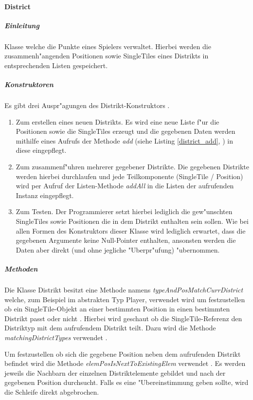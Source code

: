 \paragraph{District}
\label{par:district}
\subparagraph{Einleitung}
Klasse welche die Punkte eines Spielers verwaltet. Hierbei werden die zusammenh"angenden Positionen sowie SingleTiles eines Distrikts in entsprechenden Listen gespeichert. 

\subparagraph{Konstruktoren} 
\label{spar:districtKonstruktoren}
Es gibt drei Auspr"agungen des Distrikt-Konstruktors . 
\begin{enumerate}
	\item Zum erstellen eines neuen Distrikts. Es wird eine neue Liste f"ur die Positionen sowie die SingleTiles erzeugt und die gegebenen Daten werden mithilfe eines Aufrufs der Methode \emph{add} (siehe Listing \ref{district_add}, ) in diese eingepflegt. 
	\item Zum zusammenf"uhren mehrerer gegebener Distrikte. Die gegebenen Distrikte werden hierbei durchlaufen und jede Teilkomponente (SingleTile / Position) wird per Aufruf der Listen-Methode \emph{addAll} in die Listen der aufrufenden Instanz eingepflegt. 
	\item Zum Testen. Der Programmierer setzt hierbei lediglich die gew"unschten SingleTiles sowie Positionen die in dem Distrikt enthalten sein sollen. Wie bei allen Formen des Konstruktors dieser Klasse wird lediglich erwartet, dass die gegebenen Argumente keine Null-Pointer enthalten, ansonsten werden die Daten aber direkt (und ohne jegliche "Uberpr"ufung) "ubernommen.
\end{enumerate}

\subparagraph{Methoden}
\label{spar:districtMethoden}
Die Klasse Distrikt besitzt eine Methode namens \emph{typeAndPosMatchCurrDistrict} welche, zum Beispiel im abstrakten Typ Player, verwendet wird um festzustellen ob ein SingleTile-Objekt an einer bestimmten Position in einen bestimmten Distrikt passt oder nicht . Hierbei wird geschaut ob die SingleTile-Referenz den Distriktyp mit dem aufrufendem Distrikt teilt. Dazu wird die Methode \emph{matchingDistrictTypes} verwendet .

Um festzustellen ob sich die gegebene Position neben dem aufrufenden Distrikt befindet wird die Methode \emph{elemPosIsNextToExistingElem} verwendet . Es werden jeweils die Nachbarn der einzelnen Distriktelemente gebildet und nach der gegebenen Position durchsucht. Falls es eine "Ubereinstimmung geben sollte, wird die Schleife direkt abgebrochen. 

